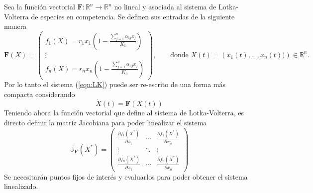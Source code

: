\newpage
\begin{definición}\label{def:LKVectorial}
	Sea la función vectorial $\mathbf{F}:\mathbb{R}^n\to\mathbb{R}^n$ no lineal y asociada al sistema de Lotka-Volterra de especies en competencia. Se definen sus entradas de la siguiente manera
	\begin{equation}\label{eqn:Fmatricial}
		\mathbf{F}(X)=\begin{pmatrix}
			f_1(X)=r_1x_1\left(1-\frac{\sum_{j=1}^n \alpha_{1j}x_j}{K_1}\right)\\
			\vdots\\
			f_n(X)=r_nx_n\left(1-\frac{\sum_{j=1}^n \alpha_{nj}x_j}{K_n}\right)
		\end{pmatrix},\qquad\text{donde $X(t)=\left(x_1(t),...,x_n(t))\right)\in\mathbb{R}^n$.}
	\end{equation}
	Por lo tanto el sistema (\ref{eqn:LK}) puede ser re-escrito de una forma más compacta considerando
	\begin{equation}\label{eqn:LKmatricial}
		\dot{X}(t) = \mathbf{F}(X(t))
	\end{equation}
	Teniendo ahora la función vectorial que define al sistema de Lotka-Volterra, es directo definir la matriz Jacobiana para poder linealizar el sistema
	\begin{equation}\label{eqn:Jacobiano}
		\mathbb{J}_\mathbf{F}(X^*) = \begin{pmatrix}
			\frac{\partial f_1(X^*)}{\partial x_1} & \cdots &\frac{\partial f_1(X^*)}{\partial x_n}\\
			\vdots & \ddots & \vdots\\
			\frac{\partial f_n(X^*)}{\partial x_1} & \cdots &\frac{\partial f_n(X^*)}{\partial x_n}
		\end{pmatrix}
	\end{equation}
	Se necesitarán puntos fijos de interés y evaluarlos para poder obtener el sistema linealizado.
\end{definición}

